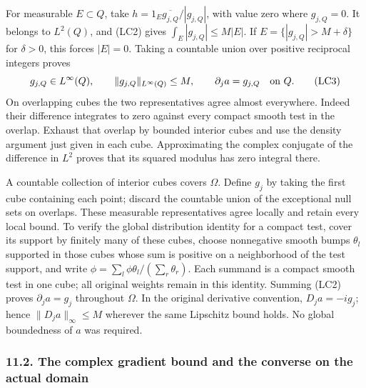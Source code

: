 \documentclass[
  11pt,
]{article}
\makeatletter
\let\ReaderOriginalAnchorStart\hyper@anchorstart
\let\ReaderOriginalAnchorEnd\hyper@anchorend
\let\ReaderPendingAliases\@empty
\def\ReaderArmAliases#1{\gdef\ReaderPendingAliases{#1}}
\def\hyper@anchorstart#1{\ReaderIfNativeAnchorTF{#1}{\ReaderPendingAliases\global\let\ReaderPendingAliases\@empty}{}\ReaderOriginalAnchorStart{#1}}
\makeatother
\begin{document}
For measurable \(E\subset Q\), take
\(h=1_E\overline{g_{j,Q}}/|g_{j,Q}|\), with value zero where
\(g_{j,Q}=0\). It belongs to \(L^2(Q)\), and (LC2) gives
\(\int_E|g_{j,Q}|\leq M|E|\). If \(E=\{|g_{j,Q}|>M+\delta\}\) for
\(\delta>0\), this forces \(|E|=0\). Taking a countable union over
positive reciprocal integers proves \[
 g_{j,Q}\in L^\infty(Q),\qquad
 \|g_{j,Q}\|_{L^\infty(Q)}\leq M,\qquad
 \partial_j a=g_{j,Q}\quad\hbox{on }Q.                         \tag{LC3}
\] On overlapping cubes the two representatives agree almost everywhere.
Indeed their difference integrates to zero against every compact smooth
test in the overlap. Exhaust that overlap by bounded interior cubes and
use the density argument just given in each cube. Approximating the
complex conjugate of the difference in \(L^2\) proves that its squared
modulus has zero integral there.

A countable collection of interior cubes covers \(\Omega\). Define
\(g_j\) by taking the first cube containing each point; discard the
countable union of the exceptional null sets on overlaps. These
measurable representatives agree locally and retain every local bound.
To verify the global distribution identity for a compact test, cover its
support by finitely many of these cubes, choose nonnegative smooth bumps
\(\theta_l\) supported in those cubes whose sum is positive on a
neighborhood of the test support, and write
\(\phi=\sum_l\phi\theta_l/(\sum_r\theta_r)\). Each summand is a compact
smooth test in one cube; all original weights remain in this identity.
Summing (LC2) proves \(\partial_j a=g_j\) throughout \(\Omega\). In the
original derivative convention, \(D_j a=-i g_j\); hence
\(\|D_j a\|_\infty\leq M\) wherever the same Lipschitz bound holds. No
global boundedness of \(a\) was required.

\ReaderArmAliases{\ReaderOriginalAnchorStart{AN03-LCE-LIP-002}\ReaderOriginalAnchorEnd\begingroup\expandafter\def\csname @currentHref\endcsname{AN03-LCE-LIP-002}\label{AN03-LCE-LIP-002}\endgroup\ReaderOriginalAnchorStart{the-complex-gradient-bound-and-the-converse-on-the-actual-domain}\ReaderOriginalAnchorEnd}
\subsubsection{11.2. The complex gradient bound and the converse on the
actual
domain}\label{the-complex-gradient-bound-and-the-converse-on-the-actual-domain}
\end{document}
